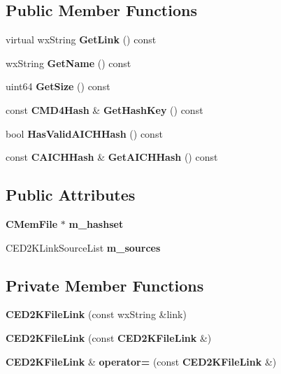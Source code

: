 \subsection*{Public Member Functions}
\begin{DoxyCompactItemize}
\item 
virtual wxString {\bfseries GetLink} () const \label{classCED2KFileLink_a7c85ec82337f116bcbcc9fed4df70070}

\item 
wxString {\bfseries GetName} () const \label{classCED2KFileLink_a083ca74999a2cad4f03653e66b37b2d8}

\item 
uint64 {\bfseries GetSize} () const \label{classCED2KFileLink_a4c796e153f36b72462e4981ee95417f7}

\item 
const {\bf CMD4Hash} \& {\bfseries GetHashKey} () const \label{classCED2KFileLink_a0af4c8326ed6efe487d0dec380586a1f}

\item 
bool {\bfseries HasValidAICHHash} () const \label{classCED2KFileLink_a8c6f6b82830d94934101309c86fcd8f1}

\item 
const {\bf CAICHHash} \& {\bfseries GetAICHHash} () const \label{classCED2KFileLink_a28ce0a30d13c0d552ea2b49f3ebb9d47}

\end{DoxyCompactItemize}
\subsection*{Public Attributes}
\begin{DoxyCompactItemize}
\item 
{\bf CMemFile} $\ast$ {\bfseries m\_\-hashset}\label{classCED2KFileLink_ae1fc968d5f5da6059cd733d7c88c25b5}

\item 
CED2KLinkSourceList {\bfseries m\_\-sources}\label{classCED2KFileLink_af96e33d725c11c6afa045963bd420bec}

\end{DoxyCompactItemize}
\subsection*{Private Member Functions}
\begin{DoxyCompactItemize}
\item 
{\bfseries CED2KFileLink} (const wxString \&link)\label{classCED2KFileLink_aa2be65b770235e6aa3381330eb256535}

\item 
{\bfseries CED2KFileLink} (const {\bf CED2KFileLink} \&)\label{classCED2KFileLink_a0ac188b13282e9f651219357226cc741}

\item 
{\bf CED2KFileLink} \& {\bfseries operator=} (const {\bf CED2KFileLink} \&)\label{classCED2KFileLink_ae106c08f2c0d03901b05f5d7dd0d8d5b}

\end{DoxyCompactItemize}
